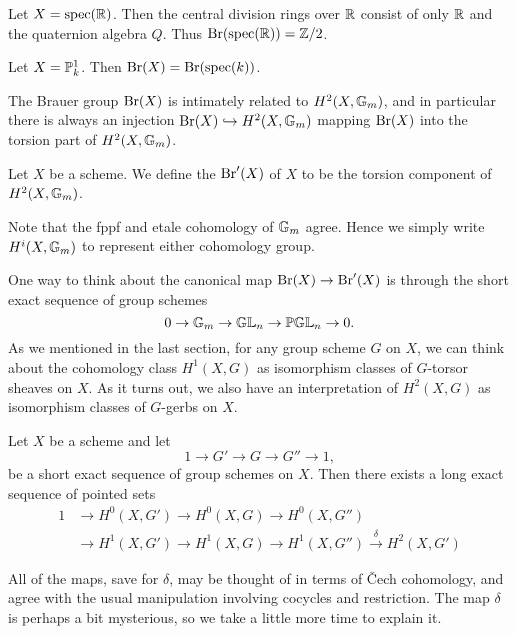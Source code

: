 \begin{ex}
Let $X = \textnormal{spec}(\mathbb{R})$.  Then the central division rings over $\mathbb{R}$ consist of only $\mathbb{R}$ and the quaternion algebra $Q$.  Thus $\textnormal{Br}(\textnormal{spec}(\mathbb{R})) = \mathbb{Z}/2$.
\end{ex}

\begin{ex}
Let $X = \mathbb{P}^1_k$.  Then $\textnormal{Br}(X) = \textnormal{Br}(\textnormal{spec}(k))$.
\end{ex}

The Brauer group $\textnormal{Br}(X)$ is intimately related to $H^2(X,\mathbb{G}_m)$, and in particular there is always an injection $\textnormal{Br}(X)\hookrightarrow H^2(X,\mathbb{G}_m)$ mapping $\textnormal{Br}(X)$ into the torsion part of $H^2(X,\mathbb{G}_m)$.
\begin{defn}
Let $X$ be a scheme.  We define the  $\textnormal{Br}'(X)$ of $X$ to be the torsion component of $H^2(X,\mathbb{G}_m)$.
\end{defn}

\begin{remk}
Note that the fppf and etale cohomology of $\mathbb{G}_m$ agree.  Hence we simply write $H^i(X,\mathbb{G}_m)$ to represent either cohomology group.
\end{remk}

One way to think about the canonical map $\textnormal{Br}(X)\rightarrow\textnormal{Br}'(X)$ is through the short exact sequence of group schemes
$$0\rightarrow \mathbb{G}_m\rightarrow\mathbb{GL}_n\rightarrow\mathbb{PGL}_n\rightarrow 0.$$
As we mentioned in the last section, for any group scheme $G$ on $X$, we can think about the cohomology class $H^1(X,G)$ as isomorphism classes of $G$-torsor sheaves on $X$.  As it turns out, we also have an interpretation of $H^2(X,G)$ as isomorphism classes of $G$-gerbs on $X$.
\begin{lem}[Giraurd]\label{giraurds lemma}
Let $X$ be a scheme and let
$$1\rightarrow G'\rightarrow G\rightarrow G''\rightarrow 1,$$
be a short exact sequence of group schemes on $X$.  Then there exists a long exact sequence of pointed sets
\begin{align*}
1 & \rightarrow H^0(X,G') \rightarrow H^0(X,G)\rightarrow H^0(X,G'')\\
  & \rightarrow H^1(X,G') \rightarrow H^1(X,G)\rightarrow H^1(X,G'')\xrightarrow{\delta} H^2(X,G')
\end{align*}
\end{lem}
All of the maps, save for $\delta$, may be thought of in terms of \v{C}ech cohomology, and agree with the usual manipulation involving cocycles and restriction.  The map $\delta$ is perhaps a bit mysterious, so we take a little more time to explain it.

